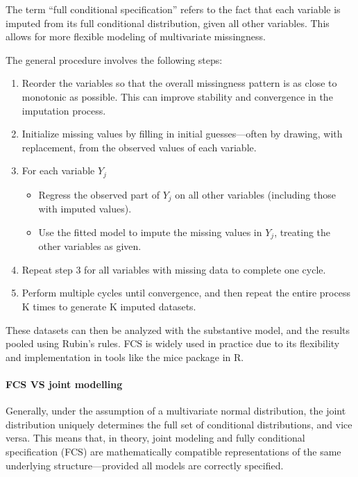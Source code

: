 \documentclass{article}
\providecommand{\tightlist}{%
  \setlength{\itemsep}{0pt}\setlength{\parskip}{0pt}}
\begin{document}
The term ``full conditional specification'' refers to the fact that each
variable is imputed from its full conditional distribution, given all
other variables. This allows for more flexible modeling of multivariate
missingness.

The general procedure involves the following steps:

\begin{enumerate}
\def\labelenumi{\arabic{enumi}.}
\item
  Reorder the variables so that the overall missingness pattern is as
  close to monotonic as possible. This can improve stability and
  convergence in the imputation process.
\item
  Initialize missing values by filling in initial guesses---often by
  drawing, with replacement, from the observed values of each variable.
\item
  For each variable \(Y_{j}\)

  \begin{itemize}
  \tightlist
  \item
    Regress the observed part of \(Y_{j}\) on all other variables
    (including those with imputed values).
  \item
    Use the fitted model to impute the missing values in \(Y_{j}\),
    treating the other variables as given.
  \end{itemize}
\item
  Repeat step 3 for all variables with missing data to complete one
  cycle.
\item
  Perform multiple cycles until convergence, and then repeat the entire
  process K times to generate K imputed datasets.
\end{enumerate}

These datasets can then be analyzed with the substantive model, and the
results pooled using Rubin's rules. FCS is widely used in practice due
to its flexibility and implementation in tools like the mice package in
R.

\paragraph{FCS VS joint modelling}\label{fcs-vs-joint-modelling}

Generally, under the assumption of a multivariate normal distribution,
the joint distribution uniquely determines the full set of conditional
distributions, and vice versa. This means that, in theory, joint
modeling and fully conditional specification (FCS) are mathematically
compatible representations of the same underlying structure---provided
all models are correctly specified.
\end{document}
